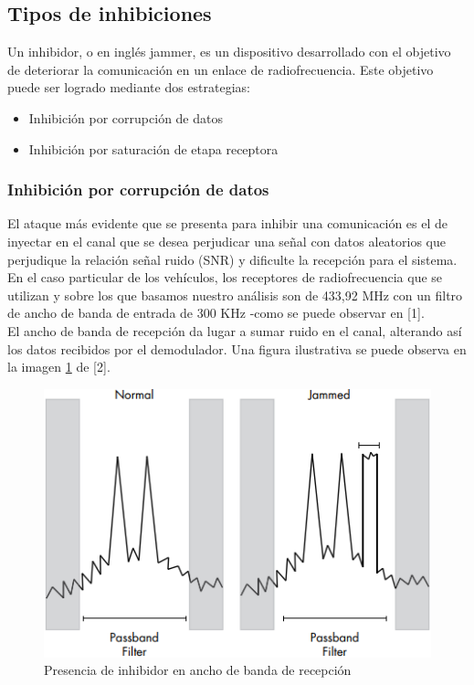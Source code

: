 \documentclass[12pt]{report}
\begin{document}
\subsection{Tipos de inhibiciones}

Un inhibidor, o en inglés jammer, es un dispositivo desarrollado con el objetivo de deteriorar la comunicación en un enlace de 
radiofrecuencia. Este objetivo puede ser logrado mediante dos estrategias:

\begin{itemize}
    \item Inhibición por corrupción de datos
    \item Inhibición por saturación de etapa receptora

\end{itemize}

\subsubsection{Inhibición por corrupción de datos}

El ataque más evidente que se presenta para inhibir una comunicación es el de inyectar en el canal que se desea perjudicar una señal con 
datos aleatorios que perjudique la relación señal ruido (SNR) y dificulte la recepción para el sistema. \\
En el caso particular de los vehículos, los receptores de radiofrecuencia que se utilizan y sobre los que basamos nuestro análisis
son de 433,92 MHz con un filtro de ancho de banda de entrada de 300 KHz -como se puede observar en [1].\\
El ancho de banda de recepción da lugar a sumar ruido en el canal, alterando así los datos recibidos por el demodulador. Una figura
ilustrativa se puede observa en la imagen \ref{fpb_jam} de [2].

\begin{figure}[htb]
	\centering
	\includegraphics[scale=0.8]{fpb_jam.png}
	\caption{Presencia de inhibidor en ancho de banda de recepción}
	\label{fpb_jam}
\end{figure}
\end{document}
